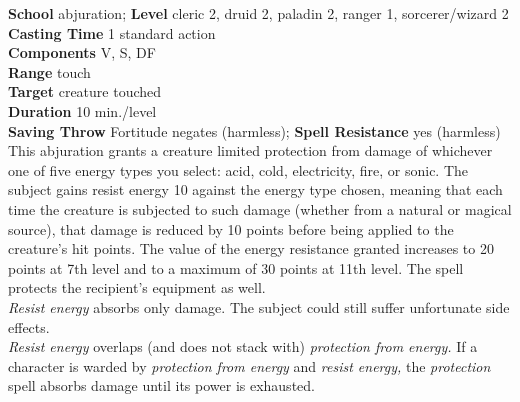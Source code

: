 \textbf{School} abjuration; \textbf{Level} cleric 2, druid 2, paladin 2, ranger 1, sorcerer/wizard 2\\
\textbf{Casting Time} 1 standard action\\
\textbf{Components} V, S, DF\\
\textbf{Range} touch\\
\textbf{Target} creature touched\\
\textbf{Duration} 10 min./level\\
\textbf{Saving Throw} Fortitude negates (harmless); \textbf{Spell Resistance} yes (harmless)\\
This abjuration grants a creature limited protection from damage of whichever one of five energy types you select: acid, cold, electricity, fire, or sonic. The subject gains resist energy 10 against the energy type chosen, meaning that each time the creature is subjected to such damage (whether from a natural or magical source), that damage is reduced by 10 points before being applied to the creature's hit points. The value of the energy resistance granted increases to 20 points at 7th level and to a maximum of 30 points at 11th level. The spell protects the recipient's equipment as well.\\
\textit{Resist energy }absorbs only damage. The subject could still suffer unfortunate side effects.\\
\textit{Resist energy }overlaps (and does not stack with) \textit{protection from energy. }If a character is warded by \textit{protection from energy }and \textit{resist energy, }the \textit{protection }spell absorbs damage until its power is exhausted.\\
